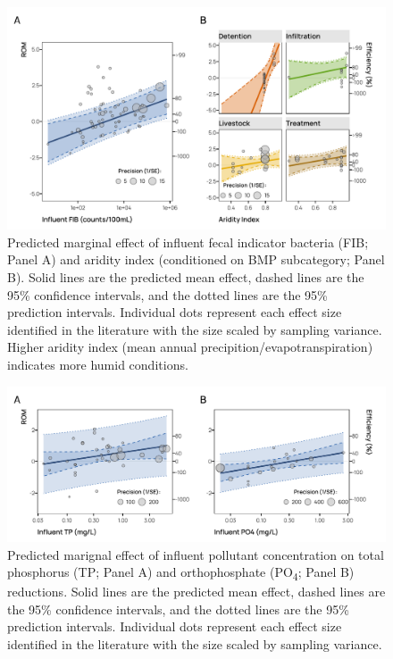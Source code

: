 \documentclass[utf8]{FrontiersinHarvard}
\begin{document}
\begin{figure}[p]
\includegraphics[width=1\linewidth,]{frontiers_submission_revision_01_files/figure-latex/fig6} \caption{Predicted marginal effect of influent fecal indicator bacteria (FIB; Panel A) and aridity index (conditioned on BMP subcategory; Panel B). Solid lines are the predicted mean effect, dashed lines are the 95\% confidence intervals, and the dotted lines are the 95\% prediction intervals. Individual dots represent each effect size identified in the literature with the size scaled by sampling variance. Higher aridity index (mean annual precipition/evapotranspiration) indicates more humid conditions.}\label{fig:fig6}
\end{figure}

\begin{figure}[p]
\includegraphics[width=1\linewidth,]{frontiers_submission_revision_01_files/figure-latex/fig7} \caption{Predicted marignal effect of influent pollutant concentration on total phosphorus (TP; Panel A) and orthophosphate (PO\textsubscript{4}; Panel B) reductions. Solid lines are the predicted mean effect, dashed lines are the 95\% confidence intervals, and the dotted lines are the 95\% prediction intervals. Individual dots represent each effect size identified in the literature with the size scaled by sampling variance.}\label{fig:fig7}
\end{figure}
\end{document}
